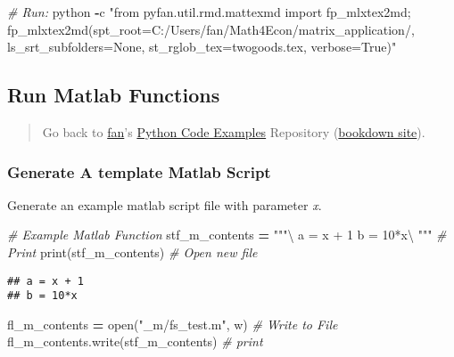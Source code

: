 \documentclass[
]{book}
\newenvironment{Shaded}{\begin{snugshade}}{\end{snugshade}}
\newcommand{\BuiltInTok}[1]{#1}
\newcommand{\CommentTok}[1]{\textcolor[rgb]{0.56,0.35,0.01}{\textit{#1}}}
\newcommand{\NormalTok}[1]{#1}
\newcommand{\OperatorTok}[1]{\textcolor[rgb]{0.81,0.36,0.00}{\textbf{#1}}}
\newcommand{\StringTok}[1]{\textcolor[rgb]{0.31,0.60,0.02}{#1}}
\begin{document}
\begin{Shaded}
\begin{Highlighting}[]
\CommentTok{\# Run:}
\NormalTok{python }\OperatorTok{{-}}\NormalTok{c }\StringTok{"from pyfan.util.rmd.mattexmd import fp\_mlxtex2md; fp\_mlxtex2md(spt\_root=\textquotesingle{}C:/Users/fan/Math4Econ/matrix\_application/\textquotesingle{}, ls\_srt\_subfolders=None, st\_rglob\_tex=\textquotesingle{}twogoods.tex\textquotesingle{}, verbose=True)"}
\end{Highlighting}
\end{Shaded}

\hypertarget{run-matlab-functions}{%
\subsection{Run Matlab Functions}\label{run-matlab-functions}}

\begin{quote}
Go back to \href{http://fanwangecon.github.io/}{fan}'s \href{https://fanwangecon.github.io/pyfan/}{Python Code Examples} Repository (\href{https://fanwangecon.github.io/pyfan/bookdown}{bookdown site}).
\end{quote}

\hypertarget{generate-a-template-matlab-script}{%
\subsubsection{Generate A template Matlab Script}\label{generate-a-template-matlab-script}}

Generate an example matlab script file with parameter \emph{x}.

\begin{Shaded}
\begin{Highlighting}[]
\CommentTok{\# Example Matlab Function}
\NormalTok{stf\_m\_contents }\OperatorTok{=} \StringTok{"""\textbackslash{}}
\StringTok{a = x + 1}
\StringTok{b = 10*x\textbackslash{}}
\StringTok{"""}
\CommentTok{\# Print}
\BuiltInTok{print}\NormalTok{(stf\_m\_contents)}
\CommentTok{\# Open new file}
\end{Highlighting}
\end{Shaded}

\begin{verbatim}
## a = x + 1
## b = 10*x
\end{verbatim}

\begin{Shaded}
\begin{Highlighting}[]
\NormalTok{fl\_m\_contents }\OperatorTok{=} \BuiltInTok{open}\NormalTok{(}\StringTok{"\_m/fs\_test.m"}\NormalTok{, }\StringTok{\textquotesingle{}w\textquotesingle{}}\NormalTok{)}
\CommentTok{\# Write to File}
\NormalTok{fl\_m\_contents.write(stf\_m\_contents)}
\CommentTok{\# print}
\end{Highlighting}
\end{Shaded}
\end{document}

